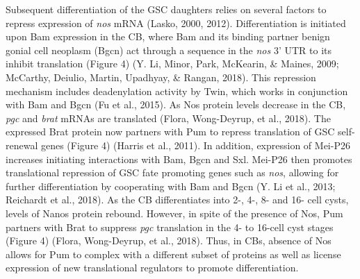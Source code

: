 \documentclass[12pt,oneside]{reedthesis}
\begin{document}
Subsequent differentiation of the GSC daughters relies on several
factors to repress expression of \emph{nos} mRNA (Lasko, 2000, 2012). Differentiation is initiated upon Bam expression in the
CB, where Bam and its binding partner benign gonial cell neoplasm (Bgcn)
act through a sequence in the \emph{nos} 3' UTR to its inhibit translation
(Figure 4) (Y. Li, Minor, Park, McKearin, \& Maines, 2009; McCarthy, Deiulio, Martin, Upadhyay, \& Rangan, 2018). This repression mechanism
includes deadenylation activity by Twin, which works in conjunction with
Bam and Bgcn (Fu et al., 2015). As Nos protein levels decrease in the CB,
\emph{pgc} and \emph{brat} mRNAs are translated (Flora, Wong-Deyrup, et al., 2018). The expressed
Brat protein now partners with Pum to repress translation of GSC
self-renewal genes (Figure 4) (Harris et al., 2011). In addition, expression
of Mei-P26 increases initiating interactions with Bam, Bgcn and Sxl.
Mei-P26 then promotes translational repression of GSC fate promoting
genes such as \emph{nos}, allowing for further differentiation by cooperating
with Bam and Bgcn (Y. Li et al., 2013; Reichardt et al., 2018). As the CB
differentiates into 2-, 4-, 8- and 16- cell cysts, levels of Nanos
protein rebound. However, in spite of the presence of Nos, Pum partners
with Brat to suppress \emph{pgc} translation in the 4- to 16-cell cyst stages
(Figure 4) (Flora, Wong-Deyrup, et al., 2018). Thus, in CBs, absence of Nos allows for Pum
to complex with a different subset of proteins as well as license
expression of new translational regulators to promote differentiation.
\end{document}
